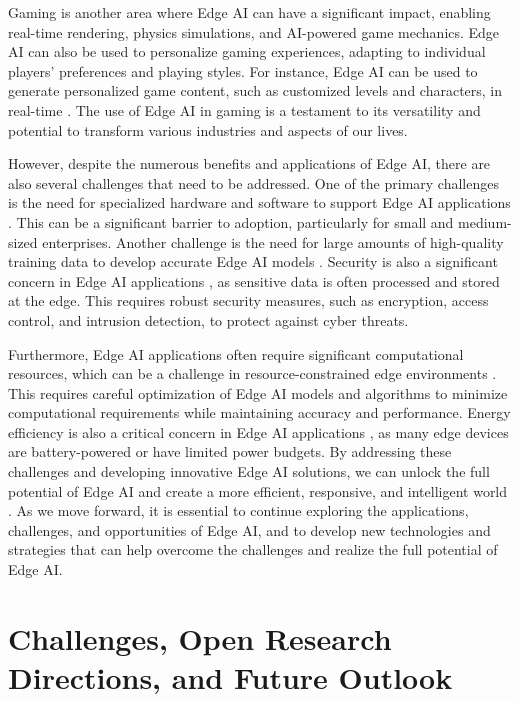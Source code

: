 \documentclass[11pt]{article}
\begin{document}
Gaming is another area where Edge AI \cite{ref79} can have a significant impact, enabling real-time rendering, physics simulations, and AI-powered game mechanics. Edge AI can also be used to personalize gaming experiences, adapting to individual players' preferences and playing styles. For instance, Edge AI can be used to generate personalized game content, such as customized levels and characters, in real-time \cite{ref79}. The use of Edge AI in gaming is a testament to its versatility and potential to transform various industries and aspects of our lives.

However, despite the numerous benefits and applications of Edge AI, there are also several challenges that need to be addressed. One of the primary challenges is the need for specialized hardware and software to support Edge AI applications \cite{ref10}. This can be a significant barrier to adoption, particularly for small and medium-sized enterprises. Another challenge is the need for large amounts of high-quality training data to develop accurate Edge AI models \cite{ref198}. Security is also a significant concern in Edge AI applications \cite{ref44}, as sensitive data is often processed and stored at the edge. This requires robust security measures, such as encryption, access control, and intrusion detection, to protect against cyber threats.

Furthermore, Edge AI applications often require significant computational resources, which can be a challenge in resource-constrained edge environments \cite{ref199}. This requires careful optimization of Edge AI models and algorithms to minimize computational requirements while maintaining accuracy and performance. Energy efficiency is also a critical concern in Edge AI applications \cite{ref166}, as many edge devices are battery-powered or have limited power budgets. By addressing these challenges and developing innovative Edge AI solutions, we can unlock the full potential of Edge AI and create a more efficient, responsive, and intelligent world \cite{ref78}. As we move forward, it is essential to continue exploring the applications, challenges, and opportunities of Edge AI, and to develop new technologies and strategies that can help overcome the challenges and realize the full potential of Edge AI.

\section{Challenges, Open Research Directions, and Future Outlook}
\end{document}
